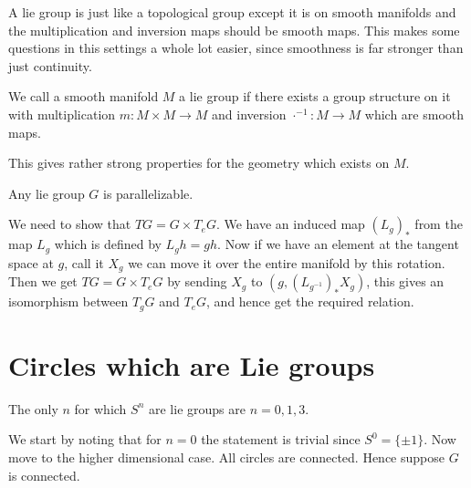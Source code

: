 \documentclass[../Thesis.tex]{subfiles}
\begin{document}
A lie group is just like a topological group except it is on smooth manifolds and the multiplication and inversion maps should be smooth maps. This makes some questions in this settings a whole lot easier, since smoothness is far stronger than just continuity.
\begin{mydef}
We call a smooth manifold $M$ a lie group if there exists a group structure on it with multiplication $m : M \times M \rightarrow M$ and inversion $\cdot^{-1}: M \rightarrow M$ which are smooth maps.
\end{mydef}
This gives rather strong properties for the geometry which exists on $M$. 
\begin{lemma}
Any lie group $G$ is parallelizable.
\end{lemma}
\begin{myproof}
We need to show that $TG = G \times T_eG$. We have an induced map $(L_g)_*$ from the map $L_g$ which is defined by $L_gh = gh$. Now if we have an element at the tangent space at $g$, call it $X_g$ we can move it over the entire manifold by this rotation. Then we get $TG = G \times T_eG$ by sending $X_g$ to $(g, (L_{g^{-1}})_*X_g)$, this gives an isomorphism between $T_gG$ and $T_eG$, and hence get the required relation.
\end{myproof}
\section{Circles which are Lie groups}
\begin{theorem}
The only $n$ for which $S^n$ are lie groups are $n = 0,1,3$.
\end{theorem}
\begin{myproof}
We start by noting that for $n = 0$ the statement is trivial since $S^0 = \{\pm 1\}$. Now move to the higher dimensional case. All circles are connected. Hence suppose $G$ is connected.
\\
\end{myproof}
\end{document}
